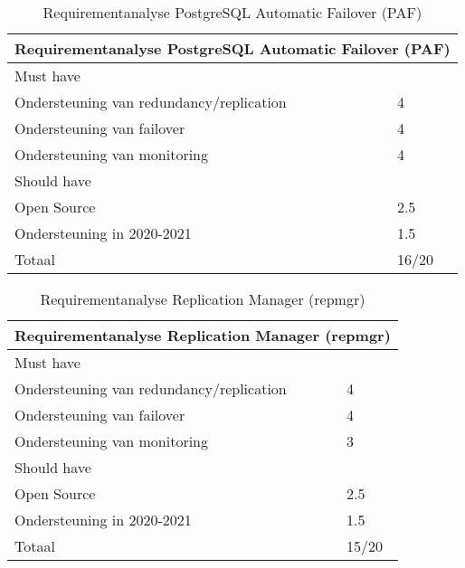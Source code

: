\begin{table}[!h]
    \begin{tabular}{ |p{6cm}||p{6cm}|  }
        \hline
        \multicolumn{2}{|c|}{Requirementanalyse PostgreSQL Automatic Failover (PAF)} \\
        \hline
        Must have & \\
        \hline
        Ondersteuning van redundancy/replication  & 4 \\
        Ondersteuning van failover &  4 \\
        Ondersteuning van monitoring & 4 \\
        \hline
        Should have & \\
        \hline
        Open Source &  2.5 \\
        Ondersteuning in 2020-2021 & 1.5 \\
        \hline
        \hline
        Totaal & 16/20 \\
        \hline    
    \end{tabular}
    \caption{Requirementanalyse PostgreSQL Automatic Failover (PAF)}
    \label{table:Requirementanalyse PostgreSQL Automatic Failover (PAF)}
\end{table}


\begin{table}[!h]
    \begin{tabular}{ |p{6cm}||p{6cm}|  }
        \hline
        \multicolumn{2}{|c|}{Requirementanalyse Replication Manager (repmgr)} \\
        \hline
        Must have & \\
        \hline
        Ondersteuning van redundancy/replication  & 4 \\
        Ondersteuning van failover &  4 \\
        Ondersteuning van monitoring & 3 \\
        \hline
        Should have & \\
        \hline
        Open Source &  2.5 \\
        Ondersteuning in 2020-2021 & 1.5 \\
        \hline
        \hline
        Totaal & 15/20 \\
        \hline
    \end{tabular}
    \caption{Requirementanalyse Replication Manager (repmgr)}
    \label{table:Requirementanalyse Replication Manager (repmgr)}
\end{table}


